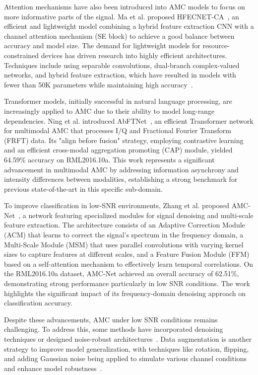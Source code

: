 \documentclass[conference]{IEEEtran}
\begin{document}
Attention mechanisms have also been introduced into AMC models to focus on more informative parts of the signal. Ma et al. proposed HFECNET-CA~\cite{ma2023hfecnetca}, an efficient and lightweight model combining a hybrid feature extraction CNN with a channel attention mechanism (SE block) to achieve a good balance between accuracy and model size. The demand for lightweight models for resource-constrained devices has driven research into highly efficient architectures. Techniques include using separable convolutions, dual-branch complex-valued networks, and hybrid feature extraction, which have resulted in models with fewer than 50K parameters while maintaining high accuracy~\cite{guo2024ulcnn, ma2023hfecnetca, xu2025ldcvnn}.

Transformer models, initially successful in natural language processing, are increasingly applied to AMC due to their ability to model long-range dependencies. Ning et al. introduced AbFTNet~\cite{ning2024abftnet}, an efficient Transformer network for multimodal AMC that processes I/Q and Fractional Fourier Transform (FRFT) data. Its "align before fusion" strategy, employing contrastive learning and an efficient cross-modal aggregation promoting (CAP) module, yielded 64.59\% accuracy on RML2016.10a. This work represents a significant advancement in multimodal AMC by addressing information asynchrony and intensity differences between modalities, establishing a strong benchmark for previous state-of-the-art in this specific sub-domain. 

To improve classification in low-SNR environments, Zhang et al. proposed AMC-Net~\cite{zhang2023amcnet}, a network featuring specialized modules for signal denoising and multi-scale feature extraction. The architecture consists of an Adaptive Correction Module (ACM) that learns to correct the signal's spectrum in the frequency domain, a Multi-Scale Module (MSM) that uses parallel convolutions with varying kernel sizes to capture features at different scales, and a Feature Fusion Module (FFM) based on a self-attention mechanism to effectively learn temporal correlations. On the RML2016.10a dataset, AMC-Net achieved an overall accuracy of 62.51\%, demonstrating strong performance particularly in low SNR conditions. The work highlights the significant impact of its frequency-domain denoising approach on classification accuracy.

Despite these advancements, AMC under low SNR conditions remains challenging. To address this, some methods have incorporated denoising techniques or designed noise-robust architectures~\cite{yao2019modulation}. Data augmentation is another strategy to improve model generalization, with techniques like rotation, flipping, and adding Gaussian noise being applied to simulate various channel conditions and enhance model robustness~\cite{zhang2023efficient}.
\end{document}
